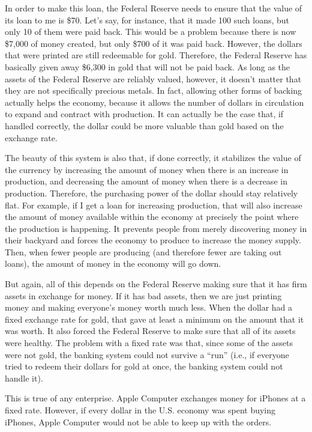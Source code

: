 In order to make this loan, the Federal Reserve needs to ensure that the
value of its loan to me is \$70. Let’s say, for instance, that it made
100 such loans, but only 10 of them were paid back. This would be a
problem because there is now \$7,000 of money created, but only \$700
of it was paid back. However, the dollars that were printed are still
redeemable for gold. Therefore, the Federal Reserve has basically given
away \$6,300 in gold that will not be paid back. As long as the assets
of the Federal Reserve are reliably valued, however, it doesn’t matter
that they are not specifically precious metals. In fact, allowing other
forms of backing actually helps the economy, because it allows the
number of dollars in circulation to expand and contract with
production. It can actually be the case that, if handled correctly, the
dollar could be more valuable than gold based on the exchange rate.

The beauty of this system is also that, if done correctly, it stabilizes
the value of the currency by increasing the amount of money when there
is an increase in production, and decreasing the amount of money when
there is a decrease in production. Therefore, the purchasing power of
the dollar should stay relatively flat.
For example, if I get
a loan for increasing production, that will also increase the amount of
money available within the economy at precisely the point where the
production is happening. It prevents people from merely discovering
money in their backyard and forces the economy to produce to increase
the money supply. Then, when fewer people are producing (and therefore
fewer are taking out loans), the amount of money in the economy will go
down.

But again, all of this depends on the Federal Reserve making sure that
it has firm assets in exchange for money. If it has bad assets, then we
are just printing money and making everyone’s money worth much less.
When the dollar had a fixed exchange rate for gold, that gave at least
a minimum on the amount that it was worth. It also forced the Federal
Reserve to make sure that all of its assets were healthy. The problem
with a fixed rate was that, since some of the assets
were not gold, the
banking system could
not survive a “run” (i.e., if everyone tried to redeem their dollars
for gold at once, the banking system
could not handle it).

This is true of any enterprise. Apple Computer exchanges money for
iPhones at a fixed rate. However, if every dollar in the U.S. economy
was spent buying iPhones, Apple Computer would not be able to keep up
with the orders.

